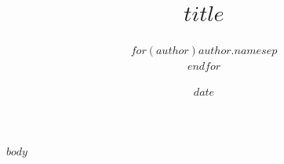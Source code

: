\documentclass{article}
\title{$title$}       %
\author{$for(author)$$author.name$$sep$ \\ $endfor$}  %
\date{$date$}         %
\begin{document}
\maketitle
\tableofcontents
\newpage

$body$
\end{document}
